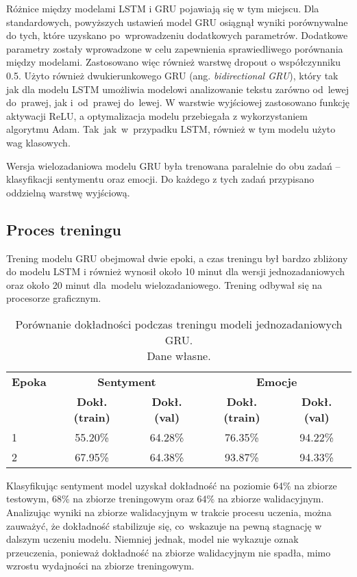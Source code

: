Różnice między modelami LSTM i GRU pojawiają się w tym miejscu. Dla standardowych, powyższych ustawień model GRU osiągnął wyniki porównywalne do tych, które uzyskano po~wprowadzeniu dodatkowych parametrów. Dodatkowe parametry zostały wprowadzone w celu zapewnienia sprawiedliwego porównania między modelami. Zastosowano więc również warstwę dropout o współczynniku 0.5. Użyto również dwukierunkowego GRU (ang. \textit{bidirectional GRU}), który tak jak dla modelu LSTM umożliwia modelowi analizowanie tekstu zarówno od~lewej do~prawej, jak i~od~prawej do~lewej. W warstwie wyjściowej zastosowano funkcję aktywacji ReLU, a optymalizacja modelu przebiegała z wykorzystaniem algorytmu Adam. Tak~jak~w~przypadku LSTM, również w tym modelu użyto wag klasowych.

Wersja wielozadaniowa modelu GRU była trenowana paralelnie do obu zadań -- klasyfikacji sentymentu oraz emocji. Do każdego z tych zadań przypisano oddzielną warstwę wyjściową.

\newpage
\subsection{Proces treningu} 
Trening modelu GRU obejmował dwie epoki, a czas treningu był bardzo zbliżony do modelu LSTM i również wynosił około 10 minut dla wersji jednozadaniowych oraz około 20 minut dla~modelu wielozadaniowego. Trening odbywał się na procesorze graficznym.

\begin{table}[H]
\centering
\label{tab:gru_training_process}
\begin{tabular}{|l|c|c|c|c|}
\hline
\textbf{Epoka} & \multicolumn{2}{c|}{\textbf{Sentyment}} & \multicolumn{2}{c|}{\textbf{Emocje}} \\
\cline{2-5}
& \textbf{Dokł. (train)} & \textbf{Dokł. (val)} & \textbf{Dokł. (train)} & \textbf{Dokł. (val)} \\
\hline
1 & 55.20\% & 64.28\% & 76.35\% & 94.22\% \\
2 & 67.95\% & 64.38\% & 93.87\% & 94.33\% \\
\hline
\end{tabular}
\caption{Porównanie dokładności podczas treningu modeli jednozadaniowych GRU.\\Dane własne.}
\end{table}

Klasyfikując sentyment model uzyskał dokładność na poziomie 64\% na zbiorze testowym, 68\% na zbiorze treningowym oraz 64\% na zbiorze walidacyjnym. Analizując wyniki na zbiorze walidacyjnym w trakcie procesu uczenia, można zauważyć, że dokładność stabilizuje się, co~wskazuje na pewną stagnację w dalszym uczeniu modelu. Niemniej jednak, model nie wykazuje oznak przeuczenia, ponieważ dokładność na zbiorze walidacyjnym nie spadła, mimo wzrostu wydajności na zbiorze treningowym.

